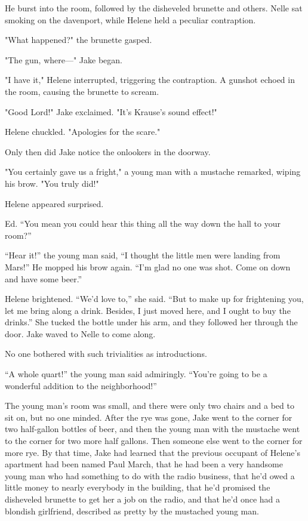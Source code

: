 \documentclass{novel}
\begin{document}
He burst into the room, followed by the disheveled brunette and others. Nelle sat smoking on the davenport, while Helene held a peculiar contraption.

"What happened?" the brunette gasped.

"The gun, where—" Jake began.

"I have it," Helene interrupted, triggering the contraption. A gunshot echoed in the room, causing the brunette to scream.

"Good Lord!" Jake exclaimed. "It's Krause's sound effect!"

Helene chuckled. "Apologies for the scare."

Only then did Jake notice the onlookers in the doorway.

"You certainly gave us a fright," a young man with a mustache remarked, wiping his brow. "You truly did!"

Helene appeared surprised.

Ed. “You mean you could hear this thing all the way down the hall to your room?”

“Hear it!” the young man said, “I thought the little men were landing from Mars!” He mopped his brow again. “I’m glad no one was shot. Come on down and have some beer.”

Helene brightened. “We’d love to,” she said. “But to make up for frightening you, let me bring along a drink. Besides, I just moved here, and I ought to buy the drinks.” She tucked the bottle under his arm, and they followed her through the door. Jake waved to Nelle to come along.

No one bothered with such trivialities as introductions.

“A whole quart!” the young man said admiringly. “You’re going to be a wonderful addition to the neighborhood!”

The young man’s room was small, and there were only two chairs and a bed to sit on, but no one minded. After the rye was gone, Jake went to the corner for two half-gallon bottles of beer, and then the young man with the mustache went to the corner for two more half gallons. Then someone else went to the corner for more rye. By that time, Jake had learned that the previous occupant of Helene’s apartment had been named Paul March, that he had been a very handsome young man who had something to do with the radio business, that he’d owed a little money to nearly everybody in the building, that he’d promised the disheveled brunette to get her a job on the radio, and that he’d once had a blondish girlfriend, described as pretty by the mustached young man.
\end{document}
